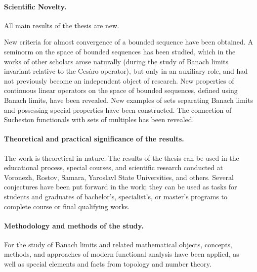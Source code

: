 \paragraph{Scientific Novelty.}
All main results of the thesis are new.

New criteria for almost convergence of a bounded sequence have been obtained.
A seminorm on the space of bounded sequences has been studied,
which in the works of other scholars arose naturally
(during the study of Banach limits invariant relative to the Cesàro operator),
but only in an auxiliary role,
and had not previously become an independent object of research.
New properties of continuous linear operators on the space of bounded sequences,
defined using Banach limits, have been revealed.
New examples of sets separating Banach limits and possessing special properties have been constructed.
The connection of Sucheston functionals with sets of multiples has been revealed.

\paragraph{Theoretical and practical significance of the results.}
The work is theoretical in nature.
The results of the thesis can be used in the educational process, special courses, and scientific research
conducted at Voronezh, Rostov, Samara, Yaroslavl State Universities, and others.
Several conjectures have been put forward in the work;
they can be used as tasks for students and graduates of bachelor's, specialist's, or master's programs
to complete course or final qualifying works.


\paragraph{Methodology and methods of the study.}
For the study of Banach limits and related mathematical objects, concepts, methods, and approaches of modern functional analysis
have been applied, as well as special elements and facts from topology and number theory.

